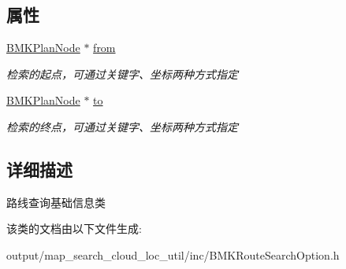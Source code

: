 \subsection*{属性}
\begin{DoxyCompactItemize}
\item 
\hypertarget{interface_b_m_k_base_route_plan_option_afb4bc6a8468e1bf3dbb24c86abf06827}{\hyperlink{interface_b_m_k_plan_node}{B\+M\+K\+Plan\+Node} $\ast$ \hyperlink{interface_b_m_k_base_route_plan_option_afb4bc6a8468e1bf3dbb24c86abf06827}{from}}\label{interface_b_m_k_base_route_plan_option_afb4bc6a8468e1bf3dbb24c86abf06827}

\begin{DoxyCompactList}\small\item\em 检索的起点，可通过关键字、坐标两种方式指定 \end{DoxyCompactList}\item 
\hypertarget{interface_b_m_k_base_route_plan_option_a6a01852ca226bdc1f580bb4a10745c62}{\hyperlink{interface_b_m_k_plan_node}{B\+M\+K\+Plan\+Node} $\ast$ \hyperlink{interface_b_m_k_base_route_plan_option_a6a01852ca226bdc1f580bb4a10745c62}{to}}\label{interface_b_m_k_base_route_plan_option_a6a01852ca226bdc1f580bb4a10745c62}

\begin{DoxyCompactList}\small\item\em 检索的终点，可通过关键字、坐标两种方式指定 \end{DoxyCompactList}\end{DoxyCompactItemize}


\subsection{详细描述}
路线查询基础信息类 

该类的文档由以下文件生成\+:\begin{DoxyCompactItemize}
\item 
output/map\+\_\+search\+\_\+cloud\+\_\+loc\+\_\+util/inc/B\+M\+K\+Route\+Search\+Option.\+h\end{DoxyCompactItemize}
